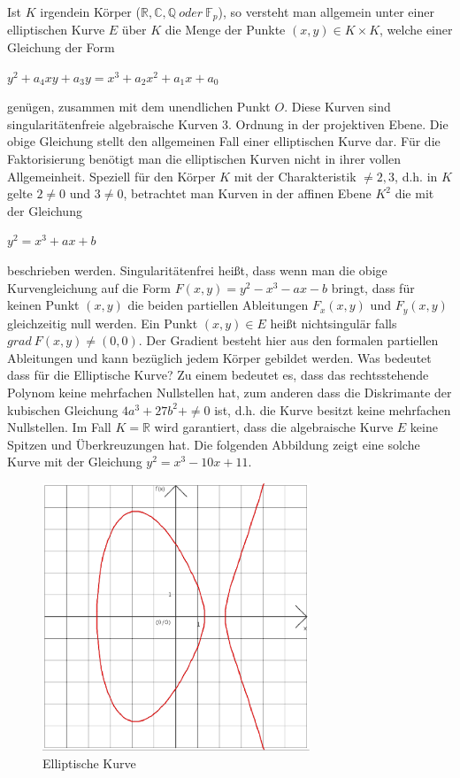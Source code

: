 \documentclass[10pt, bigheadings]{scrartcl}
\begin{document}
Ist $K$ irgendein Körper ($\mathbb R,\mathbb C,\mathbb Q\ oder\ \mathbb F_p $),
so versteht man allgemein unter einer elliptischen
Kurve $E$ über $K$ die Menge der Punkte $(x,y) \in K \times K$, welche einer 
Gleichung der Form
\begin{center}
$y^2 + a_4xy + a_3y = x^3 + a_2x^2+a_1x+a_0$ 
\end{center} 
genügen, zusammen mit dem unendlichen Punkt $O$. 
Diese Kurven sind singularitätenfreie algebraische Kurven 3. Ordnung
in der projektiven Ebene. Die obige Gleichung stellt den allgemeinen Fall
einer elliptischen Kurve dar. Für die Faktorisierung benötigt man die 
elliptischen Kurven nicht in ihrer vollen Allgemeinheit. Speziell für den 
Körper $K$ mit der Charakteristik $\neq 2,3$, d.h. in $K$ gelte $2\neq0$
und $3\neq0$, betrachtet man Kurven in der affinen Ebene $K^2$ die mit der 
Gleichung 
\begin{center}
$y^2 = x^3 + ax+b$ 
\end{center} 
beschrieben werden. Singularitätenfrei heißt, dass wenn man die obige 
Kurvengleichung auf die Form $F(x,y) = y^2 - x^3 - ax - b$ bringt,
dass für keinen Punkt $(x,y)$ die beiden partiellen Ableitungen $F_x(x,y)$ und
$F_y(x,y)$ gleichzeitig null werden. Ein Punkt $(x,y) \in E$ heißt nichtsingulär
falls $grad\ F(x,y) \neq (0,0)$. Der Gradient besteht hier aus den formalen
partiellen Ableitungen und kann bezüglich jedem Körper gebildet werden. Was 
bedeutet dass für die Elliptische Kurve? Zu einem bedeutet es, dass das 
rechtsstehende Polynom keine mehrfachen Nullstellen hat, zum anderen dass die 
Diskrimante der kubischen Gleichung $4a^3+27b^2+\neq0$ ist, d.h. die Kurve
besitzt keine mehrfachen Nullstellen. Im Fall $K=\mathbb R$ wird garantiert, 
dass die algebraische Kurve $E$ keine Spitzen und Überkreuzungen hat. Die 
folgenden Abbildung zeigt eine solche Kurve mit der Gleichung $y^2 = x^3-10x+11$.
\begin{figure}[ht]
\begin{center}
\includegraphics[width=8cm]{ec-1.eps}
\caption{Elliptische Kurve}
\end{center}
\end{figure}
\end{document}
